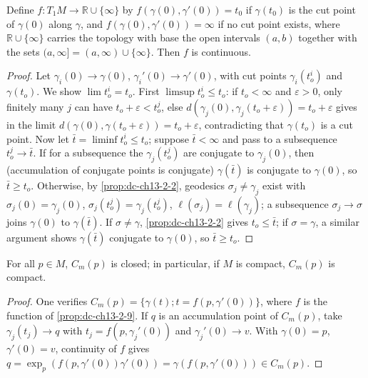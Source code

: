 \begin{proposition}
  \label{prop:dc-ch13-2-9}
  Define $f:T_1M\to\mathbb{R}\cup\{\infty\}$ by $f(\gamma(0),\gamma'(0))=t_0$ if
  $\gamma(t_0)$ is the cut point of $\gamma(0)$ along $\gamma$, and
  $f(\gamma(0),\gamma'(0))=\infty$ if no cut point exists, where $\mathbb{R}\cup\{\infty\}$
  carries the topology with base the open intervals $(a,b)$ together with the sets
  $(a,\infty]=(a,\infty)\cup\{\infty\}$. Then $f$ is continuous.
\end{proposition}
\begin{proof}
\sketch
  Let $\gamma_i(0)\to\gamma(0)$, $\gamma_i'(0)\to\gamma'(0)$, with cut points
  $\gamma_i(t_o^i)$ and $\gamma(t_o)$. We show $\lim t_o^i=t_o$. First
  $\limsup t_o^i\leq t_o$: if $t_o<\infty$ and $\varepsilon>0$, only finitely many $j$
  can have $t_o+\varepsilon<t_o^j$, else $d(\gamma_j(0),\gamma_j(t_o+\varepsilon))=t_o+\varepsilon$
  gives in the limit $d(\gamma(0),\gamma(t_o+\varepsilon))=t_o+\varepsilon$,
  contradicting that $\gamma(t_o)$ is a cut point. Now let
  $\bar t=\liminf t_o^i\leq t_o$; suppose $\bar t<\infty$ and pass to a subsequence
  $t_o^j\to\bar t$. If for a subsequence the $\gamma_j(t_o^j)$ are conjugate to
  $\gamma_j(0)$, then (accumulation of conjugate points is conjugate) $\gamma(\bar t)$
  is conjugate to $\gamma(0)$, so $\bar t\geq t_o$. Otherwise, by \cref{prop:dc-ch13-2-2},
  geodesics $\sigma_j\neq\gamma_j$ exist with $\sigma_j(0)=\gamma_j(0)$,
  $\sigma_j(t_o^j)=\gamma_j(t_o^j)$, $\ell(\sigma_j)=\ell(\gamma_j)$; a subsequence
  $\sigma_j\to\sigma$ joins $\gamma(0)$ to $\gamma(\bar t)$. If $\sigma\neq\gamma$,
  \cref{prop:dc-ch13-2-2} gives $t_o\leq\bar t$; if $\sigma=\gamma$, a similar argument shows
  $\gamma(\bar t)$ conjugate to $\gamma(0)$, so $\bar t\geq t_o$.
\end{proof}

\begin{corollary}
  \label{cor:dc-ch13-2-10}
  For all $p\in M$, $C_m(p)$ is closed; in particular, if $M$ is compact, $C_m(p)$ is
  compact.
\end{corollary}
\begin{proof}
\sketch
  One verifies $C_m(p)=\{\gamma(t);t=f(p,\gamma'(0))\}$, where $f$ is the
  function of \cref{prop:dc-ch13-2-9}. If $q$ is an accumulation point of $C_m(p)$, take
  $\gamma_j(t_j)\to q$ with $t_j=f(p,\gamma_j'(0))$ and $\gamma_j'(0)\to v$. With
  $\gamma(0)=p$, $\gamma'(0)=v$, continuity of $f$ gives
  $q=\exp_p(f(p,\gamma'(0))\gamma'(0))=\gamma(f(p,\gamma'(0)))\in C_m(p)$.
\end{proof}

